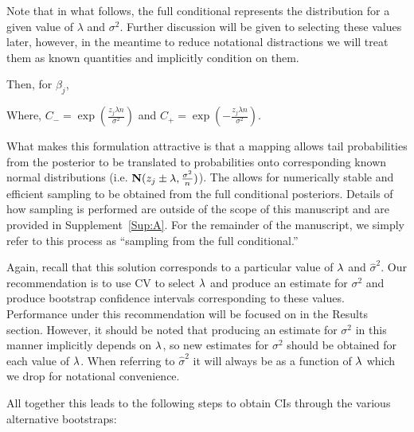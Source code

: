 Note that in what follows, the full conditional represents the distribution for a given value of $\lambda$ and $\sigma^2$. Further discussion will be given to selecting these values later, however, in the meantime to reduce notational distractions we will treat them as known quantities and implicitly condition on them.

Then, for $\beta_j$,


Where, $C_{-} = \exp(\frac{z_j \lambda n}{\sigma^2})$ and $C_{+} = \exp(-\frac{z_j \lambda n}{\sigma^2})$.

What makes this formulation attractive is that a mapping allows tail probabilities from the posterior to be translated to probabilities onto corresponding known normal distributions (i.e. $\mathbf{N}(z_j \pm \lambda, \frac{\sigma^2}{n})$). The allows for numerically stable and efficient sampling to be obtained from the full conditional posteriors. Details of how sampling is performed are outside of the scope of this manuscript and are provided in Supplement~\ref{Sup:A}. For the remainder of the manuscript, we simply refer to this process as ``sampling from the full conditional.''

Again, recall that this solution corresponds to a particular value of $\lambda$ and $\hat{\sigma}^2$. Our recommendation is to use CV to select $\lambda$ and produce an estimate for $\sigma^2$ and produce bootstrap confidence intervals corresponding to these values. Performance under this recommendation will be focused on in the Results section. However, it should be noted that producing an estimate for $\sigma^2$ in this manner implicitly depends on $\lambda$, so new estimates for $\sigma^2$ should be obtained for each value of $\lambda$. When referring to $\hat{\sigma}^2$ it will always be as a function of $\lambda$ which we drop for notational convenience.

All together this leads to the following steps to obtain CIs through the various alternative bootstraps:


